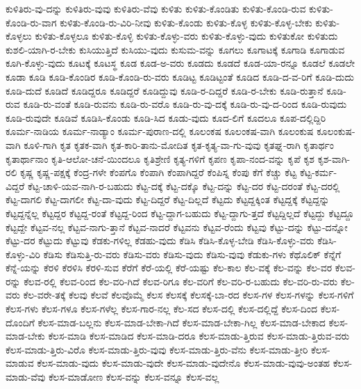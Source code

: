 {ಕುಳಿತಿರು-ವು-ದನ್ನು
ಕುಳಿತಿರು-ವುವು
ಕುಳಿತಿರು-ವೆವು
ಕುಳಿತು
ಕುಳಿತು-ಕೊಂಡಿತು
ಕುಳಿತು-ಕೊಂಡಿ-ರುವ
ಕುಳಿತು-ಕೊಂಡಿ-ರು-ವಾಗ
ಕುಳಿತು-ಕೊಂಡಿ-ರು-ವಿರಿ-ನೀವು
ಕುಳಿತು-ಕೊಂಡು
ಕುಳಿತು-ಕೊಳ್ಳ
ಕುಳಿತು-ಕೊಳ್ಳ-ಬೇಕು
ಕುಳಿತು-ಕೊಳ್ಳಲು
ಕುಳಿತು-ಕೊಳ್ಳಲೂ
ಕುಳಿತು-ಕೊಳ್ಳಿ
ಕುಳಿತು-ಕೊಳ್ಳು-ವರು
ಕುಳಿತು-ಕೊಳ್ಳು-ವುದು
ಕುಳಿತುಕೋ
ಕುಳಿತುದು
ಕುಶಲಿ-ಯಾಗಿ-ರ-ಬೇಕು
ಕುಸಿಯುತ್ತಿದೆ
ಕುಸಿಯು-ವುದು
ಕುಸುಮ-ವನ್ನು
ಕೂಗಲು
ಕೂಗಾಟಕ್ಕೆ
ಕೂಗಾಡಿ
ಕೂಗಾಡುವ
ಕೂಗಿ-ಕೊಳ್ಳು-ವುದು
ಕೂಟಕ್ಕೆ
ಕೂಟಸ್ಥ
ಕೂಡ
ಕೂಡ-ಅ-ವರು
ಕೂಡದು
ಕೂಡದೆ
ಕೂಡ-ಯಾ-ರನ್ನೂ
ಕೂಡಲೆ
ಕೂಡಲೇ
ಕೂಡಾ
ಕೂಡಿ
ಕೂಡಿ-ಕೊಂಡಿರ
ಕೂಡಿ-ಕೊಂಡಿ-ರು-ವರು
ಕೂಡಿಟ್ಟ
ಕೂಡಿಟ್ಟಂತೆ
ಕೂಡಿದ
ಕೂಡಿ-ದ-ವ-ರಿಗೆ
ಕೂಡಿ-ದುದು
ಕೂಡಿ-ದುದೆ
ಕೂಡಿದೆ
ಕೂಡಿದ್ದರೂ
ಕೂಡಿದ್ದರೆ
ಕೂಡಿದ್ದುವು
ಕೂಡಿ-ರ-ದಿದ್ದರೆ
ಕೂಡಿ-ರ-ಬೇಕು
ಕೂಡಿ-ರುತ್ತಾನೆ
ಕೂಡಿ-ರುವ
ಕೂಡಿ-ರು-ವಂತೆ
ಕೂಡಿ-ರುವನು
ಕೂಡಿ-ರು-ವರೊ
ಕೂಡಿ-ರು-ವು-ದಕ್ಕೆ
ಕೂಡಿ-ರು-ವು-ದ-ರಿಂದ
ಕೂಡಿ-ರುವುದು
ಕೂಡಿ-ರುವುದೇ
ಕೂಡಿವೆ
ಕೂಡಿಸಿ-ಕೊಂಡು
ಕೂಡಿ-ಸಿದ
ಕೂಡು-ವುದು
ಕೂದ-ಲಿಗೆ
ಕೂದಲೂ
ಕೂಪ-ದಲ್ಲಿದ್ದಿರಿ
ಕೂರ್ಮ-ನಾಡಿಯ
ಕೂರ್ಮ-ನಾಡ್ಯಾಂ
ಕೂರ್ಮ-ಪುರಾಣ-ದಲ್ಲಿ
ಕೂಲಂಕಷ
ಕೂಲಂಕಷ-ವಾಗಿ
ಕೂಲಂಕುಷ
ಕೂಲಂಕುಷ-ವಾಗಿ
ಕೂಳಿ-ಗಾಗಿ
ಕೃತ
ಕೃತಕ-ವಾಗಿ
ಕೃತ-ಕಾರಿ-ತಾನು-ಮೋದಿತ
ಕೃತ-ಕೃತ್ಯ-ವಾ-ಗು-ವುವು
ಕೃತಘ್ನ-ರಾಗಿ
ಕೃತಾರ್ಥಂ
ಕೃತಾರ್ಥಾನಾಂ
ಕೃತಿ-ಆಲೋ-ಚನೆ-ಯಿಂದಲೂ
ಕೃತಿಶ್ರೇಣಿ
ಕೃತ್ಯ-ಗಳಿಗೆ
ಕೃಪಣ
ಕೃಪಾ-ನಂದ-ವನ್ನು
ಕೃಪೆ
ಕೃಶ
ಕೃಶ-ವಾಗಿ-ರಲಿ
ಕೃಷ್ಣ
ಕೃಷ್ಣ-ಪಕ್ಷಕ್ಕೆ
ಕೆಂದ್ರ-ಗಳೇ
ಕೆಂಪಗೊ
ಕೆಂಪಾಗಿ
ಕೆಂಪಾಗಿದ್ದರೆ
ಕೆಂಪಿಸ್ನ
ಕೆಂಪು
ಕೆಗೆ
ಕೆಚ್ಚು
ಕೆಟ್ಟ
ಕೆಟ್ಟ-ಕರ್ಮ-ವಿದ್ದರೆ
ಕೆಟ್ಟ-ಚಾಳಿ-ಯವ-ನಾಗಿ-ರ-ಬಹುದು
ಕೆಟ್ಟ-ದಕ್ಕೆ
ಕೆಟ್ಟ-ದಕ್ಕೊ
ಕೆಟ್ಟ-ದನ್ನು
ಕೆಟ್ಟ-ದರ
ಕೆಟ್ಟ-ದರಂತೆ
ಕೆಟ್ಟ-ದರಲ್ಲಿ
ಕೆಟ್ಟ-ದಾಗಲಿ
ಕೆಟ್ಟ-ದಾಗಲೀ
ಕೆಟ್ಟ-ದಾ-ವುದು
ಕೆಟ್ಟ-ದಿದ್ದರೆ
ಕೆಟ್ಟ-ದಿಲ್ಲದೆ
ಕೆಟ್ಟದು
ಕೆಟ್ಟದ್ದಕ್ಕಿಂತ
ಕೆಟ್ಟದ್ದಕ್ಕೆ
ಕೆಟ್ಟದ್ದನ್ನು
ಕೆಟ್ಟದ್ದನ್ನೆಲ್ಲ
ಕೆಟ್ಟದ್ದರ
ಕೆಟ್ಟದ್ದ-ರಂತೆ
ಕೆಟ್ಟದ್ದ-ರಿಂದ
ಕೆಟ್ಟ-ದ್ದಾಗ-ಬಹುದು
ಕೆಟ್ಟ-ದ್ದಾಗು-ತ್ತದೆ
ಕೆಟ್ಟದ್ದಿಲ್ಲದೆ
ಕೆಟ್ಟದ್ದು
ಕೆಟ್ಟದ್ದೂ
ಕೆಟ್ಟದ್ದೇ
ಕೆಟ್ಟವ-ನಲ್ಲ
ಕೆಟ್ಟವ-ನಾಗು-ತ್ತಾನೆ
ಕೆಟ್ಟವ-ನಾದರೆ
ಕೆಟ್ಟವನು
ಕೆಟ್ಟವ-ರೆಂದು
ಕೆಟ್ಟವು
ಕೆಟ್ಟು-ದನ್ನು
ಕೆಟ್ಟು-ದನ್ನೋ
ಕೆಟ್ಟು-ದರ
ಕೆಟ್ಟುದು
ಕೆಟ್ಟುವು
ಕೆಡಕು-ಗಳಿಲ್ಲ
ಕೆಡಹು-ವುದು
ಕೆಡಿಸಿ
ಕೆಡಿಸಿ-ಕೊಳ್ಳ-ಬೇಡಿ
ಕೆಡಿಸಿ-ಕೊಳ್ಳು-ವರು
ಕೆಡಿಸಿ-ಕೊಳ್ಳು-ವಿರಿ
ಕೆಡಿಸು
ಕೆಡಿಸುತ್ತಿ-ರು-ವರು
ಕೆಡಿಸು-ವರು
ಕೆಡಿಸು-ವುದು
ಕೆಡಿಸು-ವುವು
ಕೆಡುಕು-ಗಳು
ಕೆಥೊಲಿಕ್
ಕೆನ್ನೆಗೆ
ಕೆನ್ನೆ-ಯನ್ನು
ಕೆರಳಿ
ಕೆರಳಿಸಿ
ಕೆರಳಿ-ಸುವ
ಕೆರೆಗೆ
ಕೆರೆ-ಯಲ್ಲಿ
ಕೆರೆ-ಯಷ್ಟು
ಕೆಲ-ಕಾಲ
ಕೆಲ-ವಕ್ಕೆ
ಕೆಲ-ವನ್ನು
ಕೆಲ-ವರ
ಕೆಲವ-ರನ್ನು
ಕೆಲವ-ರಲ್ಲಿ
ಕೆಲವ-ರಿಂದ
ಕೆಲ-ವರಿ-ಗಿದೆ
ಕೆಲವ-ರಿಗೂ
ಕೆಲ-ವರಿಗೆ
ಕೆಲ-ವರಿ-ರ-ಬಹುದು
ಕೆಲ-ವರಿ-ರು-ವರು
ಕೆಲ-ವರು
ಕೆಲ-ವರೇ-ತಕ್ಕೆ
ಕೆಲವು
ಕೆಲವೆ
ಕೆಲವೊಮ್ಮೆ
ಕೆಲಸ
ಕೆಲಸಕ್ಕೆ
ಕೆಲಸಕ್ಕೆ-ಬಾ-ರದ
ಕೆಲಸ-ಗಳ
ಕೆಲಸ-ಗಳನ್ನು
ಕೆಲಸ-ಗಳಿಗೆ
ಕೆಲಸ-ಗಳು
ಕೆಲಸ-ಗಳೂ
ಕೆಲಸ-ಗಳೆಲ್ಲ
ಕೆಲಸ-ಗಾರ-ನಲ್ಲ
ಕೆಲ-ಸದ
ಕೆಲಸ-ದಲ್ಲಿ
ಕೆಲಸ-ದಲ್ಲಿದ್ದೆ
ಕೆಲಸ-ದಿಂದ
ಕೆಲಸ-ದೊಂದಿಗೆ
ಕೆಲಸ-ಮಾಡ-ಬಲ್ಲನು
ಕೆಲಸ-ಮಾಡ-ಬೇಕಾ-ಗಿದೆ
ಕೆಲಸ-ಮಾಡ-ಬೇಕಾ-ಗಿಲ್ಲ
ಕೆಲಸ-ಮಾಡ-ಬೇಕಾದ
ಕೆಲಸ-ಮಾಡ-ಬೇಕು
ಕೆಲಸ-ಮಾಡಿ
ಕೆಲಸ-ಮಾಡಿದ
ಕೆಲಸ-ಮಾಡಿ-ದರೂ
ಕೆಲಸ-ಮಾಡು-ತ್ತಿರುವ
ಕೆಲಸ-ಮಾಡು-ತ್ತಿರುವ-ವರು
ಕೆಲಸ-ಮಾಡು-ತ್ತಿರು-ವಿರೊ
ಕೆಲಸ-ಮಾಡು-ತ್ತಿರು-ವುವು
ಕೆಲಸ-ಮಾಡು-ತ್ತಿರು-ವೆನು
ಕೆಲಸ-ಮಾಡು-ತ್ತೀರಿ
ಕೆಲಸ-ಮಾಡುವ
ಕೆಲಸ-ಮಾಡು-ವುದು
ಕೆಲಸ-ಮಾಡು-ವುದೇ
ಕೆಲಸ-ಮಾಡು-ವುದೇನೊ
ಕೆಲಸ-ಮಾಡು-ವುವು-ಅಂತಹ
ಕೆಲಸ-ಮಾಡು-ವೆವು
ಕೆಲಸ-ಮಾಡೋಣ
ಕೆಲಸ-ವನ್ನು
ಕೆಲಸ-ವನ್ನೂ
ಕೆಲಸ-ವಲ್ಲ
}
